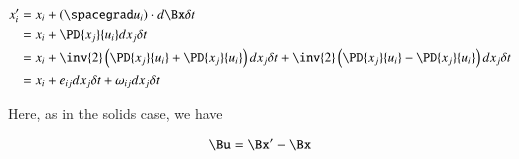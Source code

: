 \begin{align*}
x_i' 
&= x_i + (\spacegrad u_i) \cdot d\Bx \delta t \\
&= x_i + \PD{x_j}{u_i} dx_j \delta t \\
&= x_i + 
\inv{2}
\left(\PD{x_j}{u_i} 
+\PD{x_j}{u_i} 
\right)
dx_j \delta t 
+
\inv{2}
\left(\PD{x_j}{u_i} 
-\PD{x_j}{u_i} 
\right)
dx_j \delta t  \\
&=
x_i + e_{ij} dx_j \delta t + \omega_{ij} dx_j \delta t
\end{align*}

Here, as in the solids case, we have

\begin{equation}\label{eqn:continuumL8:470}
\Bu = \Bx' - \Bx
\end{equation}

%

\EndArticle
